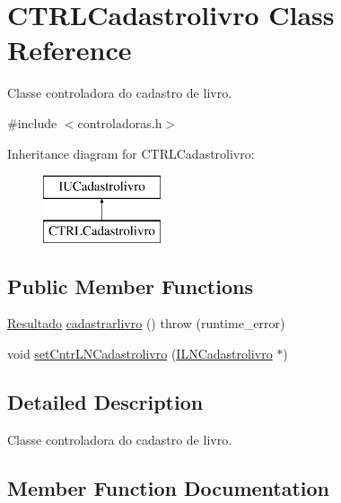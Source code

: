 \hypertarget{classCTRLCadastrolivro}{}\section{C\+T\+R\+L\+Cadastrolivro Class Reference}
\label{classCTRLCadastrolivro}


Classe controladora do cadastro de livro.  




{\ttfamily \#include $<$controladoras.\+h$>$}

Inheritance diagram for C\+T\+R\+L\+Cadastrolivro\+:\begin{figure}[H]
\begin{center}
\leavevmode
\includegraphics[height=2.000000cm]{classCTRLCadastrolivro}
\end{center}
\end{figure}
\subsection*{Public Member Functions}
\begin{DoxyCompactItemize}
\item 
\hyperlink{classResultado}{Resultado} \hyperlink{classCTRLCadastrolivro_ad932abd7bd49e2a5fbf4ba137c4df381}{cadastrarlivro} ()  throw (runtime\+\_\+error)
\item 
void \hyperlink{classCTRLCadastrolivro_a33a20d203d867a4dff37fe180b18acd4}{set\+Cntr\+L\+N\+Cadastrolivro} (\hyperlink{classILNCadastrolivro}{I\+L\+N\+Cadastrolivro} $\ast$)
\end{DoxyCompactItemize}


\subsection{Detailed Description}
Classe controladora do cadastro de livro. 

\subsection{Member Function Documentation}
\mbox{\label{classCTRLCadastrolivro_ad932abd7bd49e2a5fbf4ba137c4df381}} 
